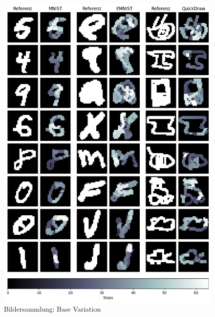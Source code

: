 \begin{figure}[!ht]
    \centering
    \includegraphics[width=\textwidth]{images/resultate/base.png}
    \caption{Bildersammlung: Base Variation}\label{fig:r-base}
\end{figure}


